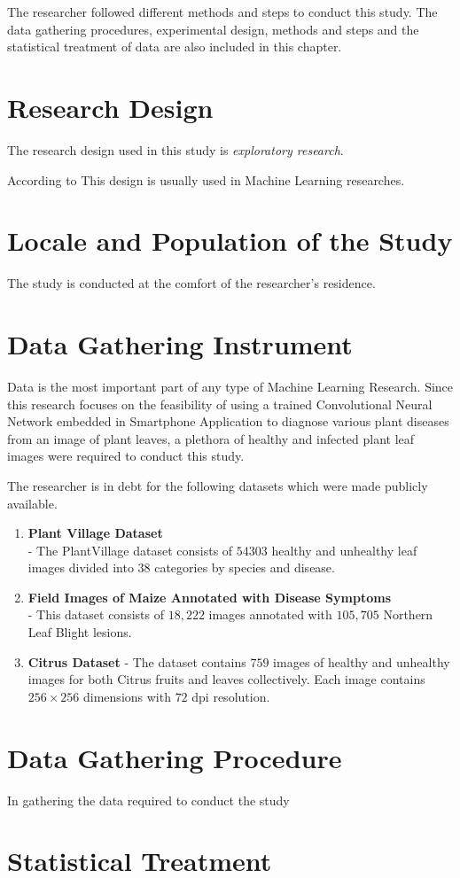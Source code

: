 

The researcher followed different methods and 
steps to conduct this study. The data gathering
procedures, experimental design, methods and steps 
and the statistical treatment of data are also 
included in this chapter.

\section{Research Design}
The research design used in this study is \emph{exploratory research}.

According to 
This design is usually used in Machine Learning researches. 

\section{Locale and Population of the Study}
The study is conducted at the comfort of the researcher's residence. 


\section{Data Gathering Instrument}
Data is the most important part of any type of Machine Learning Research. 
Since this research focuses on the feasibility of using a trained 
Convolutional Neural Network embedded in Smartphone Application to diagnose 
various plant diseases from an image of plant leaves, a plethora of 
healthy and infected plant leaf images were required to conduct this study. 

The researcher is in debt for the following datasets which were made publicly 
available. 

\begin{enumerate}
    \item \textbf{Plant Village Dataset}  \\ 
        - The PlantVillage dataset consists of $54303$ healthy and unhealthy leaf 
         images divided into $38$ categories by species and disease. 

    \item \textbf{Field Images of Maize Annotated with Disease Symptoms} \\
        - This dataset consists of $18,222$ images annotated with 
        $105,705$ Northern Leaf Blight lesions.

    \item \textbf{Citrus Dataset}
        - The dataset contains $759$ images of healthy and unhealthy images for both Citrus fruits and
         leaves collectively. Each image contains $256 \times 256$ dimensions with $72$ dpi resolution.  \\ 
\end{enumerate}

\section{Data Gathering Procedure}
In gathering the data required to conduct the study


\section{Statistical Treatment}


